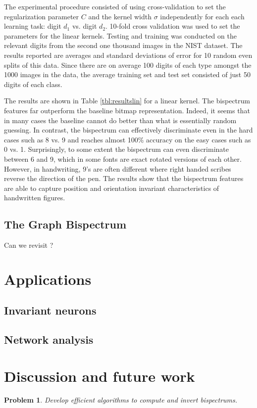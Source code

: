 \documentclass[letterpaper, 10pt]{article}
\newtheorem{problem}[theorem]{Problem}
\theoremstyle{definition}
\begin{document}
The experimental procedure consisted of using cross-validation to set the regularization parameter 
$C$ and the kernel width $\sigma$ independently for each 
each learning task: digit $d_{1}$ vs. digit $d_{2}$. 
10-fold cross validation was used to set the parameters for the linear kernels. Testing and training was conducted on the relevant digits from the second one thousand images in the NIST dataset. The results reported are averages and standard deviations of error for 10 random even splits of this data. Since there are on average 100 digits of each type amongst the 1000 images in the data, the average training set and test set consisted of just 50 digits of each class. 

The results are shown in Table \ref{tbl:resultslin} for a linear kernel.
The bispectrum features far outperform the baseline bitmap representation. 
Indeed, it seems that in many cases %
the baseline cannot do better than what is essentially random guessing. 
In contrast, the bispectrum can effectively discriminate even in the hard cases such as 8 vs. 9 and 
reaches almost 100\% accuracy on the easy cases such as 0 vs. 1. 
Surprisingly, to some extent the bispectrum can even discriminate between 6 and 9, which in some fonts are exact rotated versions of each other. 
However, in handwriting, 9's are often different where right handed scribes reverse the 
direction of the pen. The results show that the bispectrum features are able to capture position and orientation invariant 
characteristics of handwritten figures.  

\subsection{The Graph Bispectrum}

Can we revisit \cite{giusti2015clique}?

\section{Applications}

\subsection{Invariant neurons}

\cite{Mudigonda13}

\subsection{Network analysis}


\section{Discussion and future work}
\label{Sec:Discussion}

\begin{problem}
Develop efficient algorithms to compute and invert bispectrums.
\end{problem}



\end{document}
